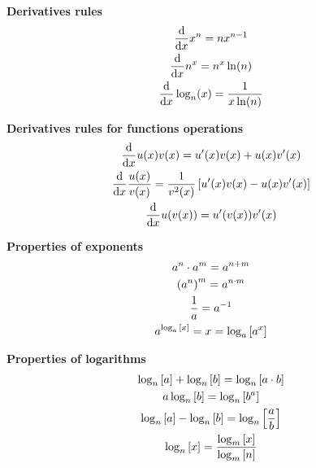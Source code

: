 \documentclass[11pt, a4paper, oneside]{article}
\begin{document}
    \begin{minipage}{0.45\textwidth}
        \textbf{Derivatives rules}
    \begin{gather*}
        \dv{x}x^n = nx^{n-1} \\ 
        \dv{x}n^x = n^x\ln(n) \\
        \dv{x}\log_{n}(x) = \frac{1}{x\ln(n)} 
    \end{gather*}
    \end{minipage}
    \hfill
    \begin{minipage}{0.45\textwidth}
        \textbf{Derivatives rules for functions operations}
        \begin{gather*}
            \dv{x}u(x)v(x) = u'(x)v(x) + u(x)v'(x) \\
            \dv{x}\frac{u(x)}{v(x)} = \frac{1}{v^{2}(x)}\left[ u'(x)v(x) - u(x)v'(x) \right] \\
            \dv{x}u(v(x)) = u'(v(x))v'(x) 
        \end{gather*}
    \end{minipage}

    \begin{minipage}{0.45\textwidth}
        \textbf{Properties of exponents}
        \begin{gather*}
            a^{n}\cdot a^{m} = a^{n+m}\\
            \qty(a^{n})^{m} = a^{n\cdot m}\\
            \frac{1}{a} = a^{-1}\\
            a^{\log_{a}\qty[x]} = x = \log_a\qty[a^{x}]
        \end{gather*}
    \end{minipage}
    \hfill
    \begin{minipage}{0.45\textwidth}
        \textbf{Properties of logarithms}
        \begin{gather*}
            \log_{n}\qty[a] + \log_{n}\qty[b] = \log_{n}\qty[a\cdot b] \\
            a\log_{n}\qty[b] = \log_{n}\qty[b^a] \\
            \log_{n}\qty[a] - \log_{n}\qty[b] = \log_{n}\qty[\frac{a}{b}] \\
            \log_{n}\qty[x] = \frac{\log_{m}\qty[x]}{\log_{m}\qty[n]}
        \end{gather*}
    \end{minipage}
\end{document}

